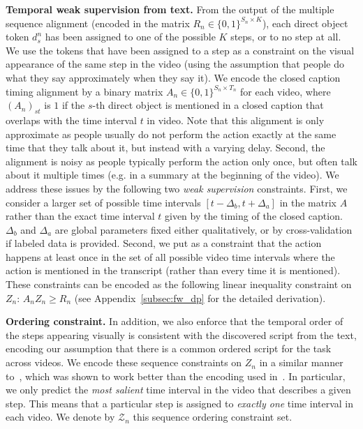 \documentclass[10pt,twocolumn,letterpaper]{article}
\begin{document}
\setlength{\tabcolsep}{6pt}

%
\textbf{Temporal weak supervision from text.} 
From the output of the multiple sequence alignment (encoded in the matrix $R_n \in \{0,1\}^{S_n \times K}$),
each direct object token $d_s^n$ has been assigned to one of the possible $K$ steps,
or to no step at all. 
We use the tokens that have been assigned to a step as 
a constraint on the visual appearance of the same step in the video (using
the assumption that people do what they say approximately when they say it).
We encode the closed caption timing alignment by a binary matrix 
$A_n \in \{0,1\}^{S_n \times T_n}$ for each video, 
where $(A_n)_{st}$ is $1$ if the $s$-th direct object is mentioned in a closed caption 
that overlaps with the time interval $t$ in video.
Note that this alignment is only approximate as people 
usually do not perform the action exactly at the same time that they talk about it, 
but instead with a varying delay.
Second, the alignment is noisy as people typically perform the action only 
once, but often talk about it multiple times (e.g. in a summary at the beginning of the video).
We address these issues by the following two \emph{weak supervision} constraints.
First, we consider a larger set of possible time intervals $[t-\Delta_b, t+\Delta_a]$ in the matrix $A$ rather than the exact time interval $t$ given by the timing of the closed caption.
$\Delta_b$ and $\Delta_a$ are global parameters fixed either qualitatively, or by cross-validation
if labeled data is provided. 
Second, we put as a constraint that the action happens at least once in the set of all possible video time intervals where the action is mentioned in the transcript (rather than every time it is mentioned).
These constraints can be encoded as the following linear inequality constraint on $Z_n$: $A_n Z_n \geq R_n$
(see Appendix~\ref{subsec:fw_dp} for the detailed derivation). 

%
\textbf{Ordering constraint.} In addition, we also enforce that the temporal order of the steps appearing
visually is consistent with the discovered script from the text, encoding
our assumption that there is a common ordered script for the task across videos.
We encode these sequence constraints on $Z_n$ in a similar manner to~\cite{Bojanowski15weakly},
which was shown to work better than the encoding used in~\cite{Bojanowski14weakly}.
In particular, we only predict the \emph{most salient} time interval in the video that describes a given step.
This means that a particular step is assigned to \emph{exactly one} time interval in each video.
We denote by $\mathcal{Z}_n$ this sequence ordering constraint set.
\end{document}
